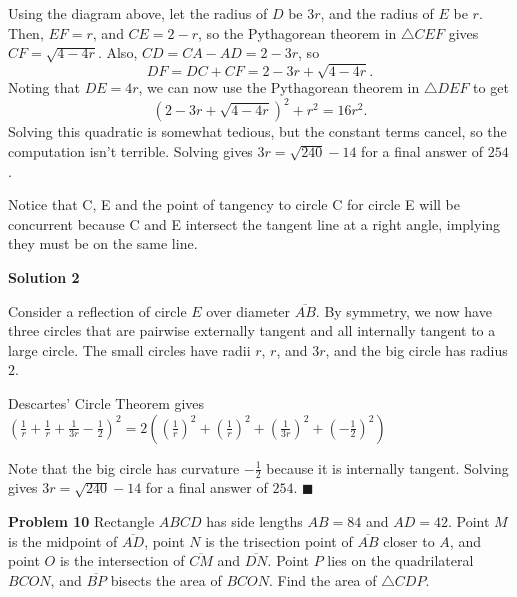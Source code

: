 \documentclass[a4paper,11pt]{article}
\begin{document}
Using the diagram above, let the radius of $D$ be $3r$, and the radius of $E$ be $r$. Then, $EF=r$, and $CE=2-r$, so the Pythagorean theorem in $\triangle CEF$ gives $CF=\sqrt{4-4r}$. Also, $CD=CA-AD=2-3r$, so \[DF=DC+CF=2-3r+\sqrt{4-4r}.\] Noting that $DE=4r$, we can now use the Pythagorean theorem in $\triangle DEF$ to get \[(2-3r+\sqrt{4-4r})^2+r^2=16r^2.\]
Solving this quadratic is somewhat tedious, but the constant terms cancel, so the computation isn't terrible. Solving gives $3r=\sqrt{240}-14$ for a final answer of $\boxed{254}$.

Notice that C, E and the point of tangency to circle C for circle E will be concurrent because C and E intersect the tangent line at a right angle, implying they must be on the same line.

\textbf{Solution 2}

Consider a reflection of circle $E$ over diameter $\overline{AB}$. By symmetry, we now have three circles that are pairwise externally tangent and all internally tangent to a large circle. The small circles have radii $r$, $r$, and $3r$, and the big circle has radius $2$.

Descartes' Circle Theorem gives $(\frac{1}{r}+\frac{1}{r}+\frac{1}{3r}-\frac12)^2 = 2((\frac{1}{r})^2+(\frac{1}{r})^2+(\frac{1}{3r})^2+(-\frac12)^2)$

Note that the big circle has curvature $-\frac12$ because it is internally tangent. Solving gives $3r=\sqrt{240}-14$ for a final answer of $\boxed{254}$. \hfill $\blacksquare$

\textbf{Problem 10}
Rectangle $ABCD$ has side lengths $AB=84$ and $AD=42$. Point $M$ is the midpoint of $\overline{AD}$, point $N$ is the trisection point of $\overline{AB}$ closer to $A$, and point $O$ is the intersection of $\overline{CM}$ and $\overline{DN}$. Point $P$ lies on the quadrilateral $BCON$, and $\overline{BP}$ bisects the area of $BCON$. Find the area of $\triangle CDP$.
\end{document}

